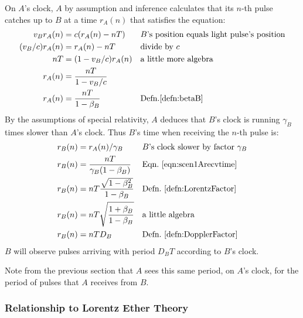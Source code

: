 \documentclass[a4paper]{article}
\theoremstyle{plain}
\theoremstyle{definition}
\begin{document}
On $A$'s clock, $A$ by assumption and inference calculates that
its $n$-th pulse catches up to $B$ at a time $r_A(n)$ that satisfies the equation:
\begin{align}
v_B r_A(n) & = c(r_A(n) - nT) & & \text{$B$'s position equals light pulse's position} \nonumber \\
(v_B / c) r_A(n) & = r_A(n) - nT & & \text{divide by $c$} \nonumber \\
nT & = (1 - v_B/c) r_A(n) & & \text{a little more algebra} \nonumber \\
r_A(n) & = \frac{nT}{1 - v_B/c} \nonumber \\
r_A(n) & = \frac{nT}{1 - \beta_B} & & \text{Defn.\eqref{defn:betaB}} \label{eqn:scen1Arecvtime}
\end{align}
By the assumptions of special relativity, $A$ deduces that $B$'s clock
is running $\gamma_B$ times slower than $A$'s clock.
Thus $B$'s time when receiving the $n$-th pulse is:
\begin{align*}
r_B(n) & = r_A(n) / \gamma_B & & \text{$B$'s clock slower by factor $\gamma_B$} \\
r_B(n) & = \frac{nT}{\gamma_B(1 - \beta_B)} & & \text{Eqn.~\eqref{eqn:scen1Arecvtime}} \\
r_B(n) & = nT \frac{\sqrt{1 - \beta_B^2}}{1 - \beta_B} & & \text{Defn.~\eqref{defn:LorentzFactor}} \\
r_B(n) & = nT \sqrt{ \frac{1 + \beta_B}{1 - \beta_B} } & & \text{a little algebra} \\
r_B(n) & = nT D_B & & \text{Defn.~\eqref{defn:DopplerFactor}}
\end{align*}
$B$ will observe pulses arriving with period $D_B T$ according to
$B$'s clock.

Note from the previous section that $A$ sees this same period, on
$A$'s clock, for the period of pulses that $A$ receives from $B$.


\subsubsection{Relationship to Lorentz Ether Theory}
\label{sec:scen1LET}
\end{document}
